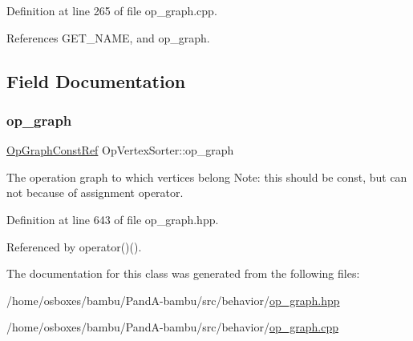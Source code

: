 Definition at line 265 of file op\+\_\+graph.\+cpp.



References G\+E\+T\+\_\+\+N\+A\+ME, and op\+\_\+graph.



\subsection{Field Documentation}
\mbox{\label{classOpVertexSorter_a5ab4591ddca482da705841dbc649974b}} 
\subsubsection{\texorpdfstring{op\+\_\+graph}{op\_graph}}
{\footnotesize\ttfamily \hyperlink{op__graph_8hpp_a9a0b240622c47584bee6951a6f5de746}{Op\+Graph\+Const\+Ref} Op\+Vertex\+Sorter\+::op\+\_\+graph\hspace{0.3cm}{\ttfamily [private]}}



The operation graph to which vertices belong Note\+: this should be const, but can not because of assignment operator. 



Definition at line 643 of file op\+\_\+graph.\+hpp.



Referenced by operator()().



The documentation for this class was generated from the following files\+:\begin{DoxyCompactItemize}
\item 
/home/osboxes/bambu/\+Pand\+A-\/bambu/src/behavior/\hyperlink{op__graph_8hpp}{op\+\_\+graph.\+hpp}\item 
/home/osboxes/bambu/\+Pand\+A-\/bambu/src/behavior/\hyperlink{op__graph_8cpp}{op\+\_\+graph.\+cpp}\end{DoxyCompactItemize}
